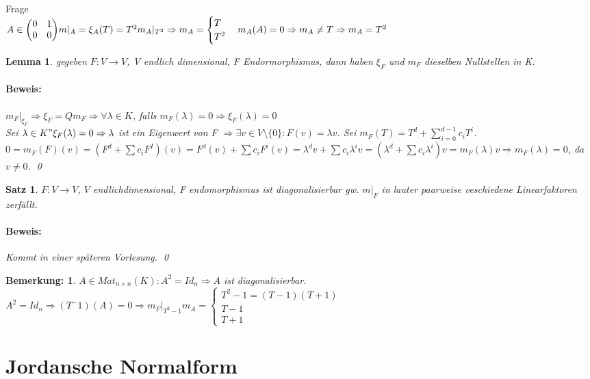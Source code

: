\documentclass{report}
\newcommand{\lb}{\lambda}
\newcommand{\ve}[1]{{\begin{pmatrix}#1 \end{pmatrix}}}
\theoremstyle{customrem}
\newtheorem*{bemerkung}{Bemerkung\textnormal:}
\theoremstyle{customdef}
\newtheorem{lemma}[definition]{Lemma}
\newtheorem{satz}[definition]{Satz}
\renewenvironment{proof}{\paragraph{Beweis: }}{\qed}
\theoremstyle{customenv}
\begin{document}
Frage\\
\(A \in \ve{0 & 1 \\ 0 & 0}
m|_A = \\
\xi_A(T) = T^2
m_A|_{T^2} \Rightarrow m_A = \begin{cases} T \\ T^2 \end{cases}
m_A(A) = 0 \Rightarrow m_A \neq T \Rightarrow m_A = T^2
\)

\begin{lemma}
  gegeben \(F : V \to V\), V endlich dimensional, F Endormorphismus, dann haben
  \(\xi_F\) und \(m_F\) dieselben Nullstellen in K.
  \begin{proof}
    \(m_F|_{\xi_F} \Rightarrow \xi_F = Q m_F \Rightarrow \forall \lb \in K\),
    falls \(m_F(\lb) = 0 \Rightarrow \xi_F(\lb) = 0\)\\
    Sei \(\lb \in K " \xi_F(\lb) = 0 \Rightarrow \lb \) ist ein Eigenwert von F
    \(\Rightarrow \exists v \in V \setminus \{0\} : F(v) = \lb v\). Sei \(m_F(T)
    = T^d + \sum_{i=0}^{d-1} c_i T^i\). \(0 = m_F(F)(v) = (F^d + \sum c_iF^I)(v)
    = F^d(v) + \sum c_i F^i(v)
    = \lb^d v + \sum c_i \lb^i v
    = (\lb^d + \sum c_i \lb^i) v
    = m_F(\lb) v
    \Rightarrow m_F(\lb) = 0\), da \(v \neq 0\).
  \end{proof}
\end{lemma}

\begin{satz}
  \(F : V \to V\), \(V\) endlichdimensional, F endomorphismus ist
  diagonalisierbar gw. \(m|_F\) in lauter paarweise veschiedene Linearfaktoren
  zerf\"allt.
  \begin{proof}
    Kommt in einer sp\"ateren Vorlesung.
  \end{proof}
\end{satz}

\begin{bemerkung}
  \(A \in Mat_{n \times n}(K) : A^2 = Id_n \Rightarrow A\) ist diagonalisierbar.\\
  \(A^2 = Id_n \Rightarrow (T^ - 1)(A) = 0 \Rightarrow m_F|_{T^2 - 1}
  m_A = \begin{cases}T^2 - 1 = (T - 1)(T + 1) \\ T - 1 \\ T + 1\end{cases}
  \)
\end{bemerkung}

\section*{Jordansche Normalform}
\end{document}
